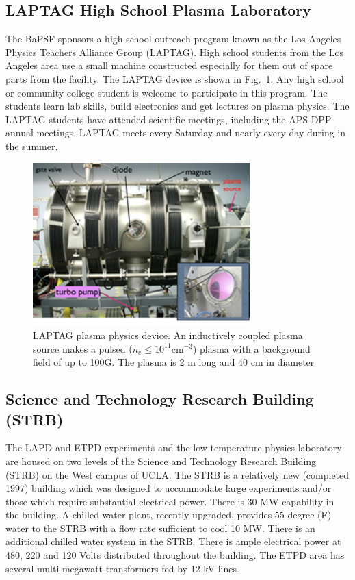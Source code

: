 \documentclass[11pt]{article}
\begin{document}
\subsection{LAPTAG High School Plasma Laboratory}
The BaPSF sponsors a high school outreach program known as the Los Angeles Physics Teachers Alliance Group  (LAPTAG).  High school students from the Los Angeles area use a small machine constructed especially for them out of spare parts from the facility.  The LAPTAG device is shown in Fig.\ \ref{fig:laptag}.  Any high school or community college student is welcome to participate in this program.  The students learn lab skills, build electronics and get lectures on plasma physics. The LAPTAG students have attended scientific meetings, including the APS-DPP annual meetings.  LAPTAG meets every Saturday and nearly every day during in the summer.
\begin{figure}[htbp] %
   \centering
   \includegraphics[width=0.75\textwidth]{laptag.jpg} 
   \caption{LAPTAG plasma physics device.  An inductively coupled plasma source makes a pulsed ($n_{e}\le 10^{11}$cm$^{-3}$) plasma with a background field of up to 100G.  The plasma is 2 m long and 40 cm in diameter}
   \label{fig:laptag}
\end{figure}


\subsection{Science and Technology Research Building (STRB)}
The LAPD and ETPD experiments and the low temperature physics laboratory are housed on two levels of the Science and Technology Research Building (STRB) on the West campus of UCLA.  The STRB is a relatively new (completed 1997) building which was designed to accommodate large experiments and/or those which require substantial electrical power.  There is 30 MW capability in the building.  A chilled water plant, recently upgraded, provides 55-degree (F) water to the STRB with a flow rate sufficient to cool 10 MW.  There is an additional chilled water system in the STRB. There is ample electrical power at 480, 220 and 120 Volts distributed throughout the building.  The ETPD area has several multi-megawatt transformers fed by 12 kV lines.
\end{document}
